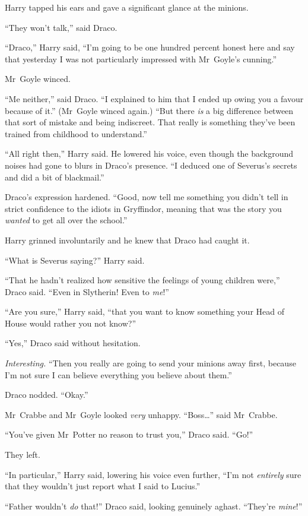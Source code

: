 Harry tapped his ears and gave a significant glance at the minions.

“They won’t talk,” said Draco.

“Draco,” Harry said, “I’m going to be one hundred percent honest here and say that yesterday I was not particularly impressed with Mr~Goyle’s cunning.”

Mr~Goyle winced.

“Me neither,” said Draco. “I explained to him that I ended up owing you a favour because of it.” (Mr~Goyle winced again.) “But there \emph{is} a big difference between that sort of mistake and being indiscreet. That really is something they’ve been trained from childhood to understand.”

“All right then,” Harry said. He lowered his voice, even though the background noises had gone to blurs in Draco’s presence. “I deduced one of Severus’s secrets and did a bit of blackmail.”

Draco’s expression hardened. “Good, now tell me something you didn’t tell in strict confidence to the idiots in Gryffindor, meaning that was the story you \emph{wanted} to get all over the school.”

Harry grinned involuntarily and he knew that Draco had caught it.

“What is Severus saying?” Harry said.

“That he hadn’t realized how sensitive the feelings of young children were,” Draco said. “Even in Slytherin! Even to \emph{me}!”

“Are you sure,” Harry said, “that you want to know something your Head of House would rather you not know?”

“Yes,” Draco said without hesitation.

\emph{Interesting.} “Then you really are going to send your minions away first, because I’m not sure I can believe everything you believe about them.”

Draco nodded. “Okay.”

Mr~Crabbe and Mr~Goyle looked \emph{very} unhappy. “Boss…” said Mr~Crabbe.

“You’ve given Mr~Potter no reason to trust you,” Draco said. “Go!”

They left.

“In particular,” Harry said, lowering his voice even further, “I’m not \emph{entirely} sure that they wouldn’t just report what I said to Lucius.”

“Father wouldn’t \emph{do} that!” Draco said, looking genuinely aghast. “They’re \emph{mine}!”

